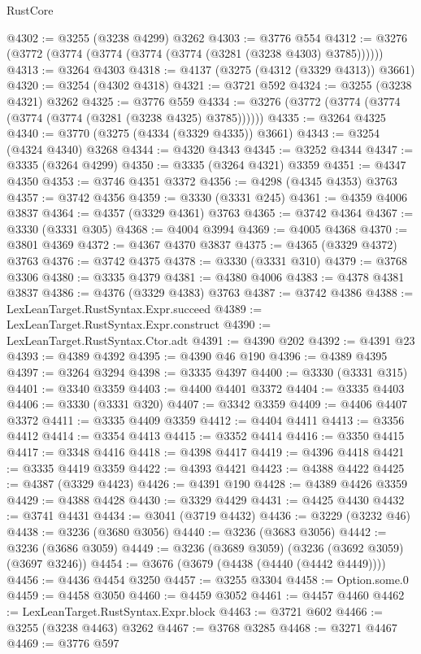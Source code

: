 \begin{lexlean}{RustCore}
\begin{coremodule}
@4302 := @3255 (@3238 @4299) @3262
@4303 := @3776 @554
@4312 := @3276 (@3772 (@3774 (@3774 (@3774 (@3774 (@3281 (@3238 @4303) @3785))))))
@4313 := @3264 @4303
@4318 := @4137 (@3275 (@4312 (@3329 @4313)) @3661)
@4320 := @3254 (@4302 @4318)
@4321 := @3721 @592
@4324 := @3255 (@3238 @4321) @3262
@4325 := @3776 @559
@4334 := @3276 (@3772 (@3774 (@3774 (@3774 (@3774 (@3281 (@3238 @4325) @3785))))))
@4335 := @3264 @4325
@4340 := @3770 (@3275 (@4334 (@3329 @4335)) @3661)
@4343 := @3254 (@4324 @4340) @3268
@4344 := @4320 @4343
@4345 := @3252 @4344
@4347 := @3335 (@3264 @4299)
@4350 := @3335 (@3264 @4321) @3359
@4351 := @4347 @4350
@4353 := @3746 @4351 @3372
@4356 := @4298 (@4345 @4353) @3763
@4357 := @3742 @4356
@4359 := @3330 (@3331 @245)
@4361 := @4359 @4006 @3837
@4364 := @4357 (@3329 @4361) @3763
@4365 := @3742 @4364
@4367 := @3330 (@3331 @305)
@4368 := @4004 @3994
@4369 := @4005 @4368
@4370 := @3801 @4369
@4372 := @4367 @4370 @3837
@4375 := @4365 (@3329 @4372) @3763
@4376 := @3742 @4375
@4378 := @3330 (@3331 @310)
@4379 := @3768 @3306
@4380 := @3335 @4379
@4381 := @4380 @4006
@4383 := @4378 @4381 @3837
@4386 := @4376 (@3329 @4383) @3763
@4387 := @3742 @4386
@4388 := LexLeanTarget.RustSyntax.Expr.succeed
@4389 := LexLeanTarget.RustSyntax.Expr.construct
@4390 := LexLeanTarget.RustSyntax.Ctor.adt
@4391 := @4390 @202
@4392 := @4391 @23
@4393 := @4389 @4392
@4395 := @4390 @46 @190
@4396 := @4389 @4395
@4397 := @3264 @3294
@4398 := @3335 @4397
@4400 := @3330 (@3331 @315)
@4401 := @3340 @3359
@4403 := @4400 @4401 @3372
@4404 := @3335 @4403
@4406 := @3330 (@3331 @320)
@4407 := @3342 @3359
@4409 := @4406 @4407 @3372
@4411 := @3335 @4409 @3359
@4412 := @4404 @4411
@4413 := @3356 @4412
@4414 := @3354 @4413
@4415 := @3352 @4414
@4416 := @3350 @4415
@4417 := @3348 @4416
@4418 := @4398 @4417
@4419 := @4396 @4418
@4421 := @3335 @4419 @3359
@4422 := @4393 @4421
@4423 := @4388 @4422
@4425 := @4387 (@3329 @4423)
@4426 := @4391 @190
@4428 := @4389 @4426 @3359
@4429 := @4388 @4428
@4430 := @3329 @4429
@4431 := @4425 @4430
@4432 := @3741 @4431
@4434 := @3041 (@3719 @4432)
@4436 := @3229 (@3232 @46)
@4438 := @3236 (@3680 @3056)
@4440 := @3236 (@3683 @3056)
@4442 := @3236 (@3686 @3059)
@4449 := @3236 (@3689 @3059) (@3236 (@3692 @3059) (@3697 @3246))
@4454 := @3676 (@3679 (@4438 (@4440 (@4442 @4449))))
@4456 := @4436 @4454 @3250
@4457 := @3255 @3304
@4458 := Option.some.{0}
@4459 := @4458 @3050
@4460 := @4459 @3052
@4461 := @4457 @4460
@4462 := LexLeanTarget.RustSyntax.Expr.block
@4463 := @3721 @602
@4466 := @3255 (@3238 @4463) @3262
@4467 := @3768 @3285
@4468 := @3271 @4467
@4469 := @3776 @597

\end{coremodule}
\end{lexlean}

